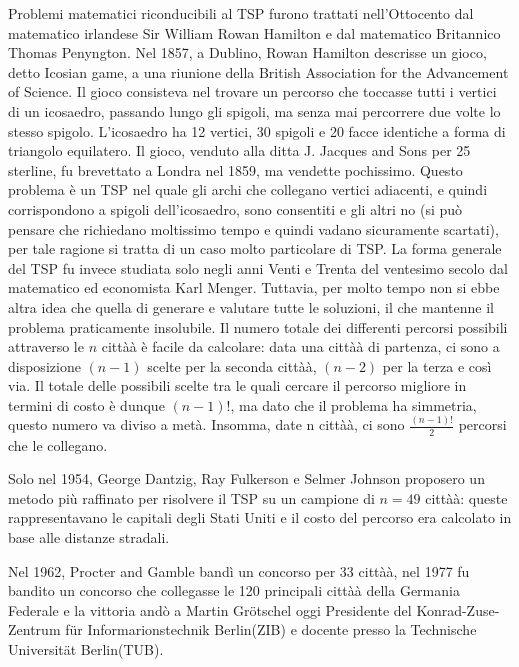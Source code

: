 \documentclass[11pt]{article}
\begin{document}
Problemi matematici riconducibili al TSP furono trattati nell'Ottocento dal matematico irlandese Sir William Rowan Hamilton e dal matematico Britannico Thomas Penyngton.  Nel 1857, a Dublino, Rowan Hamilton descrisse un gioco, detto Icosian game, a una riunione della British Association for the Advancement of Science. Il gioco consisteva nel trovare un percorso che toccasse tutti i vertici di un icosaedro, passando lungo gli spigoli, ma senza mai percorrere due volte lo stesso spigolo. L'icosaedro ha 12 vertici, 30 spigoli e 20 facce identiche a forma di triangolo equilatero.
Il gioco, venduto alla ditta J. Jacques and Sons per 25 sterline, fu brevettato a Londra nel 1859, ma vendette pochissimo. Questo problema \`e un TSP nel quale gli archi che collegano vertici adiacenti, e quindi corrispondono a spigoli dell'icosaedro, sono consentiti e gli altri no (si può pensare che richiedano moltissimo tempo e quindi vadano sicuramente scartati), per tale ragione si tratta di un caso molto particolare di TSP. La forma generale del TSP fu invece studiata solo negli anni Venti e Trenta del ventesimo secolo dal matematico ed economista Karl Menger. Tuttavia, per molto tempo non si ebbe altra idea che quella di generare e valutare tutte le soluzioni, il che mantenne il problema praticamente insolubile. Il numero totale dei differenti percorsi possibili attraverso le $n$ città\`a \`e facile da calcolare: data una città\`a di partenza, ci sono a disposizione $(n - 1)$ scelte per la seconda città\`a, $(n - 2)$ per la terza e così via. Il totale delle possibili scelte tra le quali cercare il percorso migliore in termini di costo \`e dunque $(n - 1)!$, ma dato che il problema ha simmetria, questo numero va diviso a metà. Insomma, date n città\`a, ci sono $\frac{(n-1)!}{2}$ percorsi che le collegano.

Solo nel 1954, George Dantzig, Ray Fulkerson e Selmer Johnson proposero un metodo più raffinato per risolvere il TSP  su un campione di $n = 49$ città\`a: queste rappresentavano le capitali degli Stati Uniti e il costo del percorso era calcolato in base alle distanze stradali. 

Nel 1962, Procter and Gamble bandì un concorso per 33 città\`a, nel 1977 fu bandito un concorso che collegasse le 120 principali città\`a della Germania Federale e la vittoria andò a Martin Gr\"otschel oggi Presidente del Konrad-Zuse-Zentrum f\"ur Informarionstechnik Berlin(ZIB) e docente presso la Technische Universit\"at Berlin(TUB).
\end{document}

